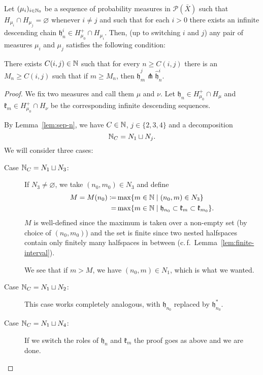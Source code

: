 \begin{lemma}[{\cite[Lemma~4.13]{MR3509968}}]
  \label{lem:4.13}
  Let \((\mu_i)_{i \in \mathbb{N}_0}\) be a sequence of probability measures in \(\mathcal{P}(\bar X)\) such that \(H_{\mu_i} \cap H_{\mu_j} = \varnothing\) whenever \(i \neq j\) and such that for each \(i > 0\) there exists an infinite descending chain \(\mathfrak{h}_n^i \in H_{\mu_0}^+ \cap H_{\mu_i}\). Then, (up to switching \(i\) and \(j\)) any pair of measures \(\mu_i\) and \(\mu_j\) satisfies the following condition:

  There exists \(C(i,j) \in \mathbb{N}\) such that for every \(n \geq C(i,j)\) there is an \(M_n \geq C(i,j)\) such that if \(m \geq M_n\), then \(\mathfrak{\hat h}^j_m \pitchfork \mathfrak{\hat h}^i_n\). 
\end{lemma}

\begin{proof}
  We fix two measures and call them \(\mu\) and \(\nu\). Let \(\mathfrak{h}_n \in H_{\mu_0}^+ \cap H_\mu\) and \(\mathfrak{k}_m \in H_{\mu_0}^+ \cap H_\nu\) be the corresponding infinite descending sequences.
  
  By Lemma~\ref{lem:sep-n}, we have \(C \in \mathbb{N}\), \(j \in \{2,3,4\}\) and a decomposition
  \[
    \mathbb{N}_C = N_1 \sqcup N_j.
  \]
  We will consider three cases:
  \begin{description}
  \item[Case \(\mathbb{N}_C = N_1 \sqcup N_3\):] If \(N_3 \neq \varnothing\), we take \((n_0, m_0) \in N_3\) and define
    \begin{align*}
      M = M(n_0)  \coloneqq & \max \{m \in \mathbb{N} \mid (n_0, m) \in N_3\}\\
                      = & \max \{m \in \mathbb{N} \mid \mathfrak{h}_{n_0} \subset \mathfrak{k}_m \subset \mathfrak{k}_{m_0}\}.
    \end{align*}
    \(M\) is well-defined since the maximum is taken over a non-empty set (by choice of \((n_0, m_0)\)) and the set is finite since two nested halfspaces contain only finitely many halfspaces in between (c.\,f.\ Lemma~\ref{lem:finite-interval}).

    We see that if \(m > M\), we have \((n_0, m) \in N_1\), which is what we wanted.
  \item[Case \(\mathbb{N}_C = N_1 \sqcup N_2\):] This case works completely analogous, with \(\mathfrak{h}_{n_0}\) replaced by \(\mathfrak{h}_{n_0}^\ast\).
  \item[Case \(\mathbb{N}_C = N_1 \sqcup N_4\):] If we switch the roles of \(\mathfrak{h}_n\) and \(\mathfrak{k}_m\) the proof goes as above and we are done.
  \end{description}
\end{proof}


